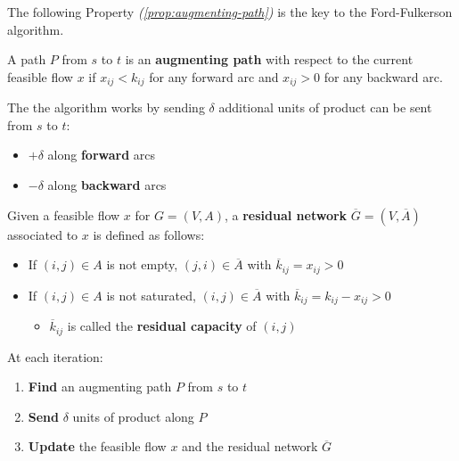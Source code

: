 \documentclass[english]{article}
\begin{document}
The following Property \textit{(\ref{prop:augmenting-path})} is the key to the Ford-Fulkerson algorithm.
\begin{property}
  \label{prop:augmenting-path}
  A path \(P\) from \(s\) to \(t\) is an \textbf{augmenting path} with respect to the current feasible flow \(x\) if \(x_{ij} <k_{ij}\) for any forward arc and \(x_{ij} > 0\) for any backward arc.
\end{property}

The the algorithm works by sending \(\delta\) additional units of product can be sent from \(s\) to \(t\):

\begin{itemize}
  \item \(+\delta\) along \textbf{forward} arcs
  \item \(-\delta\) along \textbf{backward} arcs
\end{itemize}

\bigskip
Given a feasible flow \(x\) for \(G = (V, A)\), a \textbf{residual network} \(\overline{G} = \left(V, \overline{A}\right)\) associated to \(x\) is defined as follows:

\begin{itemize}
  \item If \(\left( i, j \right) \in A\) is not empty, \(\left( j, i \right) \in \overline{A}\) with \(\overline{k}_{ij} = x_{ij} > 0\)
  \item If \(\left( i, j \right) \in A\) is not saturated, \(\left( i, j \right) \in \overline{A}\) with \(\overline{k}_{ij} = k_{ij} - x_{ij} > 0\)
        \begin{itemize}[label=\(\rightarrow\)]
          \item \(\overline{k}_{ij}\) is called the \textbf{residual capacity} of \(\left( i, j \right)\)
        \end{itemize}
\end{itemize}

At each iteration:

\begin{enumerate}[label=step \arabic*., ref=step \arabic*, leftmargin=*, labelindent=1em, widest*=8]
  \item \textbf{Find} an augmenting path \(P\) from \(s\) to \(t\)
  \item \textbf{Send} \(\delta\) units of product along \(P\)
  \item \textbf{Update} the feasible flow \(x\) and the residual network \(\overline{G}\)
\end{enumerate}
\end{document}
